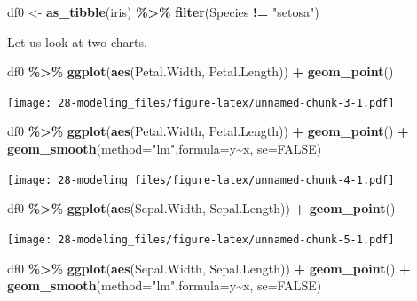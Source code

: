 \documentclass[
  xelatex, ja=standard]{bxjsbook}
\newenvironment{Shaded}{\begin{snugshade}}{\end{snugshade}}
\newcommand{\AttributeTok}[1]{\textcolor[rgb]{0.13,0.29,0.53}{#1}}
\newcommand{\ConstantTok}[1]{\textcolor[rgb]{0.56,0.35,0.01}{#1}}
\newcommand{\FunctionTok}[1]{\textcolor[rgb]{0.13,0.29,0.53}{\textbf{#1}}}
\newcommand{\NormalTok}[1]{#1}
\newcommand{\OtherTok}[1]{\textcolor[rgb]{0.56,0.35,0.01}{#1}}
\newcommand{\SpecialCharTok}[1]{\textcolor[rgb]{0.81,0.36,0.00}{\textbf{#1}}}
\newcommand{\StringTok}[1]{\textcolor[rgb]{0.31,0.60,0.02}{#1}}
\theoremstyle{definition}
\theoremstyle{definition}
\theoremstyle{definition}
\theoremstyle{definition}
\theoremstyle{remark}
\begin{document}
\begin{Shaded}
\begin{Highlighting}[]
\NormalTok{df0 }\OtherTok{\textless{}{-}} \FunctionTok{as\_tibble}\NormalTok{(iris) }\SpecialCharTok{\%\textgreater{}\%} \FunctionTok{filter}\NormalTok{(Species }\SpecialCharTok{!=} \StringTok{"setosa"}\NormalTok{)}
\end{Highlighting}
\end{Shaded}

Let us look at two charts.

\begin{Shaded}
\begin{Highlighting}[]
\NormalTok{df0 }\SpecialCharTok{\%\textgreater{}\%} \FunctionTok{ggplot}\NormalTok{(}\FunctionTok{aes}\NormalTok{(Petal.Width, Petal.Length)) }\SpecialCharTok{+} \FunctionTok{geom\_point}\NormalTok{()}
\end{Highlighting}
\end{Shaded}

\texttt{[image: 28-modeling\_files/figure-latex/unnamed-chunk-3-1.pdf]}

\begin{Shaded}
\begin{Highlighting}[]
\NormalTok{df0 }\SpecialCharTok{\%\textgreater{}\%} \FunctionTok{ggplot}\NormalTok{(}\FunctionTok{aes}\NormalTok{(Petal.Width, Petal.Length)) }\SpecialCharTok{+} \FunctionTok{geom\_point}\NormalTok{() }\SpecialCharTok{+} \FunctionTok{geom\_smooth}\NormalTok{(}\AttributeTok{method=}\StringTok{"lm"}\NormalTok{,}\AttributeTok{formula=}\NormalTok{y}\SpecialCharTok{\textasciitilde{}}\NormalTok{x, }\AttributeTok{se=}\ConstantTok{FALSE}\NormalTok{)}
\end{Highlighting}
\end{Shaded}

\texttt{[image: 28-modeling\_files/figure-latex/unnamed-chunk-4-1.pdf]}

\begin{Shaded}
\begin{Highlighting}[]
\NormalTok{df0 }\SpecialCharTok{\%\textgreater{}\%} \FunctionTok{ggplot}\NormalTok{(}\FunctionTok{aes}\NormalTok{(Sepal.Width, Sepal.Length)) }\SpecialCharTok{+} \FunctionTok{geom\_point}\NormalTok{()}
\end{Highlighting}
\end{Shaded}

\texttt{[image: 28-modeling\_files/figure-latex/unnamed-chunk-5-1.pdf]}

\begin{Shaded}
\begin{Highlighting}[]
\NormalTok{df0 }\SpecialCharTok{\%\textgreater{}\%} \FunctionTok{ggplot}\NormalTok{(}\FunctionTok{aes}\NormalTok{(Sepal.Width, Sepal.Length)) }\SpecialCharTok{+} \FunctionTok{geom\_point}\NormalTok{() }\SpecialCharTok{+} \FunctionTok{geom\_smooth}\NormalTok{(}\AttributeTok{method=}\StringTok{"lm"}\NormalTok{,}\AttributeTok{formula=}\NormalTok{y}\SpecialCharTok{\textasciitilde{}}\NormalTok{x, }\AttributeTok{se=}\ConstantTok{FALSE}\NormalTok{)}
\end{Highlighting}
\end{Shaded}
\end{document}
